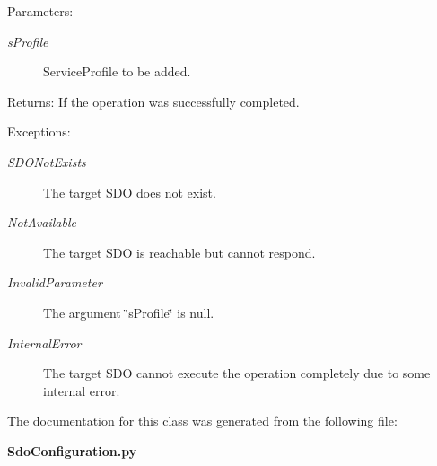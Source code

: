 \begin{Desc}
\item[Parameters:]
\begin{description}
\item[{\em s\-Profile}]Service\-Profile to be added. \end{description}
\end{Desc}
\begin{Desc}
\item[Returns:]If the operation was successfully completed. \end{Desc}
\begin{Desc}
\item[Exceptions:]
\begin{description}
\item[{\em SDONot\-Exists}]The target SDO does not exist. \item[{\em Not\-Available}]The target SDO is reachable but cannot respond. \item[{\em Invalid\-Parameter}]The argument \char`\"{}s\-Profile\char`\"{} is null. \item[{\em Internal\-Error}]The target SDO cannot execute the operation completely due to some internal error.\end{description}
\end{Desc}


The documentation for this class was generated from the following file:\begin{CompactItemize}
\item 
{\bf Sdo\-Configuration.py}\end{CompactItemize}
